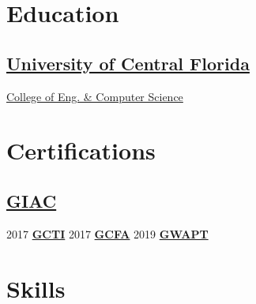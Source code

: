 \documentclass[letterpaper]{deedy-resume} %
\begin{document}
\begin{minipage}[t]{0.33\textwidth} %


\section{Education}
\subsection{\href{https://www.ucf.edu/}{University of Central Florida}}
\href{https://www.cecs.ucf.edu/}{College of Eng. \& Computer Science} \\

\sectionspace %



\section{Certifications}
\subsection{\href{https://www.giac.org/certified-professional/Joe-Pate/160481}{GIAC}}
2017 \textbf{\href{https://www.giac.org/certifications/cyber-threat-intelligence-gcti/}{GCTI}} \textbullet{} 2017 \textbf{\href{https://www.giac.org/certifications/certified-forensic-analyst-gcfa/}{GCFA}} \textbullet{} 2019 \textbf{\href{https://www.giac.org/certifications/web-application-penetration-tester-gwapt/}{GWAPT}} \\
\sectionspace %


\section{Skills}


\end{minipage}
\end{document}
